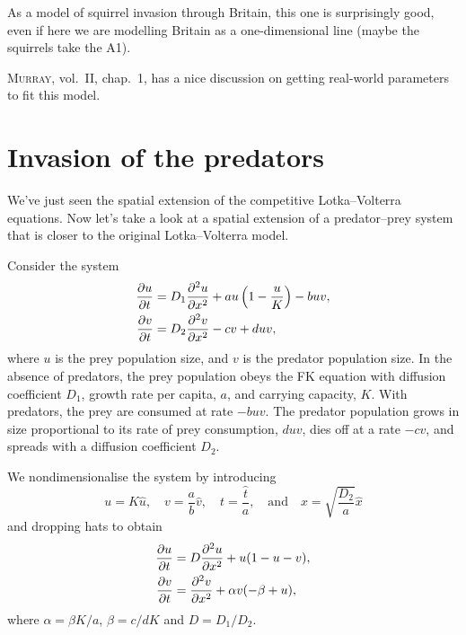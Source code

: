 \documentclass[main.tex]{subfiles}
\begin{document}
As a model of squirrel invasion through Britain, this one is surprisingly good, even if here we are modelling Britain as a one-dimensional line (maybe the squirrels take the A1). 

\begin{extra-reading}
\textsc{Murray}, vol.\ II, chap.\ 1, has a nice discussion on getting real-world parameters to fit this model.
\end{extra-reading}

\section{Invasion of the predators}
We've just seen the spatial extension of the competitive Lotka--Volterra equations. Now let's take a look at a spatial extension of a predator--prey system that is closer to the original Lotka--Volterra model.

Consider the system
\begin{subequations}
\begin{align}
	\pd{u}{t} &= D_1 \pdd{u}{x} + au\left(1-\frac{u}{K}\right) - buv,\\
	\pd{v}{t} &= D_2 \pdd{v}{x} - cv + duv,
\end{align}
\end{subequations}
where $u$ is the prey population size, and $v$ is the predator population size. In the absence of predators, the prey population obeys the FK equation with diffusion coefficient $D_1$, growth rate per capita, $a$, and carrying capacity, $K$. With predators, the prey are consumed at rate $−buv$. The predator population grows in size proportional to its rate of prey consumption, $duv$, dies off at a rate $−cv$, and spreads with a diffusion coefficient $D_2$.

We nondimensionalise the system by introducing
\begin{equation}
	u = K\hat{u}, \quad v = \frac{a}{b}\hat{v}, \quad t = \frac{\hat{t}}{a}, \quad\text{and}\quad x = \sqrt{\frac{D_2}{a}}\hat{x}
\end{equation}
and dropping hats to obtain
\begin{subequations}
\begin{align}
	\pd{u}{t} &= D\pdd{u}{x} + u(1-u-v),\\
	\pd{v}{t} &= \pdd{v}{x} + \alpha v(-\beta+u),
\end{align}
\end{subequations}
where $\alpha=\beta K/a$, $\beta = c/dK$ and $D=D_1/D_2$. 
\end{document}
